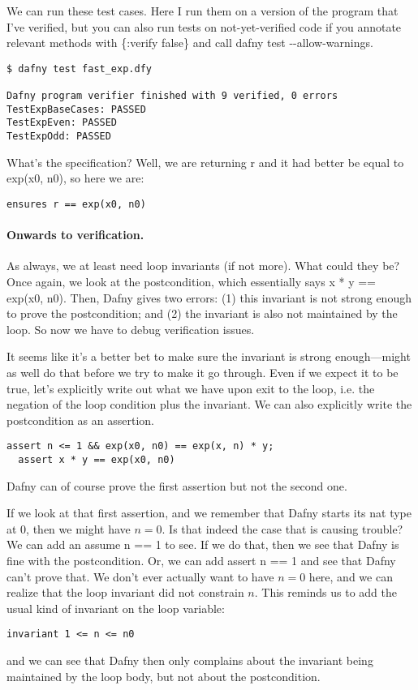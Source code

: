 \documentclass[11pt]{article}
\begin{document}
We can run these test cases. Here I run them on a version of the program that I've verified, but
you can also run tests on not-yet-verified code if you annotate relevant methods with
\textsf{\{:verify false\}} and call \textsf{dafny test -{}-allow-warnings}.
\begin{verbatim}
$ dafny test fast_exp.dfy

Dafny program verifier finished with 9 verified, 0 errors
TestExpBaseCases: PASSED
TestExpEven: PASSED
TestExpOdd: PASSED
\end{verbatim}

What's the specification? Well, we are returning \textsf{r} and it had better be equal to
\textsf{exp(x0, n0)}, so here we are:
\begin{lstlisting}[language=dafny]
  ensures r == exp(x0, n0)
\end{lstlisting}

\paragraph{Onwards to verification.}
As always, we at least need loop invariants (if not more). What could they be?
Once again, we look at the postcondition, which essentially says
\textsf{x * y == exp(x0, n0)}. Then, Dafny gives two errors: (1) this invariant
is not strong enough to prove the postcondition; and (2) the invariant is also
not maintained by the loop. So now we have to debug verification issues.

It seems like it's a better bet to make sure the invariant is strong enough---might as
well do that before we try to make it go through. Even if we expect it to be true,
let's explicitly write out what we have upon exit to the loop, i.e. the negation of the
loop condition plus the invariant. We can also explicitly write the postcondition as an assertion.
\begin{lstlisting}[language=dafny]
  assert n <= 1 && exp(x0, n0) == exp(x, n) * y;
  assert x * y == exp(x0, n0)
\end{lstlisting}
Dafny can of course prove the first assertion but not the second one.

If we look at that first assertion, and we remember that Dafny starts its \textsf{nat}
type at 0, then we might have $n = 0$. Is that indeed the case that is causing trouble?
We can add an \textsf{assume n == 1} to see. If we do that, then we see that Dafny is fine
with the postcondition. Or, we can add \textsf{assert n == 1} and see that Dafny can't prove that.
We don't ever actually want to have $n = 0$ here, and we can realize that
the loop invariant did not constrain $n$. This reminds us to add the usual kind of invariant
on the loop variable:
\begin{lstlisting}[language=dafny]
  invariant 1 <= n <= n0
\end{lstlisting}
and we can see that Dafny then only complains about the invariant being maintained by the loop body,
but not about the postcondition.
\end{document}
